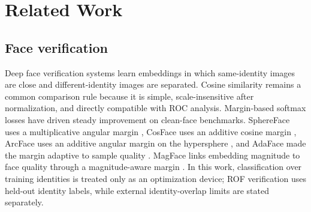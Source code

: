 \documentclass[10pt,journal,compsoc]{IEEEtran}
\begin{document}
\section{Related Work}
\label{sec:related}
\subsection{Face verification}
Deep face verification systems learn embeddings in which same-identity images are close and different-identity images are separated. Cosine similarity remains a common comparison rule because it is simple, scale-insensitive after normalization, and directly compatible with ROC analysis. Margin-based softmax losses have driven steady improvement on clean-face benchmarks. SphereFace uses a multiplicative angular margin \cite{sphereface}, CosFace uses an additive cosine margin \cite{cosface}, ArcFace uses an additive angular margin on the hypersphere \cite{arcface}, and AdaFace made the margin adaptive to sample quality \cite{adaface}. MagFace links embedding magnitude to face quality through a magnitude-aware margin \cite{magface}. In this work, classification over training identities is treated only as an optimization device; ROF verification uses held-out identity labels, while external identity-overlap limits are stated separately.
\end{document}
